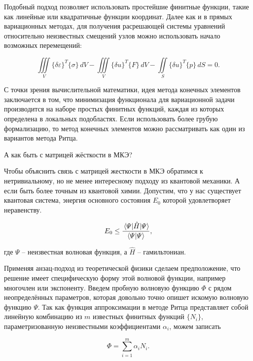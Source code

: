 \documentclass{article}
\begin{document}
Подобный подход позволяет использовать простейшие финитные функции, такие как линейные или квадратичные функции координат. Далее как и в прямых вариационных методах, для получения расрешающей системы уравнений относительно неизвестных смещений узлов можно использовать начало возможных перемещений:

\begin{displaymath}
	\iiint\limits_V \{ \delta \varepsilon \}^{T} \{\sigma\} \,dV - \iiint\limits_V \{ \delta u \}^{T} \{ F \} \,dV - \iint\limits_S \{ \delta u \}^{T} \{ p \} \,dS = 0.
\end{displaymath}

С точки зрения вычислительной математики, идея метода конечных элементов заключается в том, что минимизация функционала для вариационной задачи производится на наборе простых финитных функций, каждая из которых определена в локальных подобластях. Если использовать более грубую формализацию, то метод конечных элементов можно рассматривать как один из вариантов метода Ритца.

\newpage
\begin{question}
	А как быть с матрицей жёсткости в МКЭ?
\end{question}

Чтобы объяснить связь с матрицей жесткости в МКЭ обратимся к нетривиальному, но не менее интересному подходу из квантовой механики. А если быть более точным из квантовой химии.
Допустим, что у нас существует квантовая система, энергия основного состояния $E_{0}$ которой удовлетворяет неравенству.

\begin{displaymath}
	E_{0} \leq \frac{\expval{\hat{H}}{\varPsi}}{\bra{\varPsi} \ket{\varPsi}},
\end{displaymath}

\noindent где $\varPsi$ -- неизвестная волновая функция, а $\hat{H}$ -- гамильтониан.

Применяя анзац-подход из теоретической физики сделаем предположение, 
что решение имеет специфическую форму этой волновой функции, например многочлен или экспоненту. Введем пробную волновую функцию $\varPhi$ с рядом неопределённых параметров, 
которая довольно точно опишет искомую волновую функцию $\varPsi$. Так как функция аппроксимации в методе Ритца представляет собой линейную комбинацию из $m$ известных финитных функций $\{ N_{i} \}$, параметризованную неизвестными коэффициентами $\alpha_{i}$, можем записать

\begin{displaymath}
	\varPhi = \sum_{i=1}^{m} \alpha_{i} N_{i}.
\end{displaymath}
\end{document}
